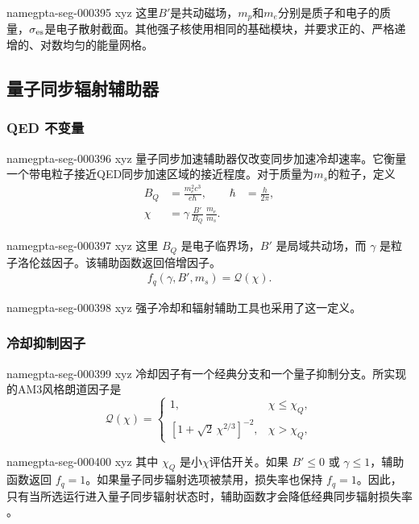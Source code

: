 \documentclass[twocolumn]{aastex702}
\makeatletter
\providecommand{\gptareaderanchor}[1]{\pdfdest name{#1} xyz}%
\providecommand{\gptareaderanchor}[1]{\special{pdf:dest (#1) [ @thispage /XYZ @xpos @ypos null ]}}%
\makeatother
\begin{document}
\gptareaderanchor{gpta-seg-000395}%
这里\(B'\)是共动磁场，\(m_p\)和\(m_e\)分别是质子和电子的质量，\(\sigma_{\rm es}\)是电子散射截面。其他强子核使用相同的基础模块，并要求正的、严格递增的、对数均匀的能量网格。

\subsection{量子同步辐射辅助器}

\subsubsection{QED 不变量}


\gptareaderanchor{gpta-seg-000396}%
量子同步加速辅助器仅改变同步加速冷却速率。它衡量一个带电粒子接近QED同步加速区域的接近程度。对于质量为\(m_s\)的粒子，定义
\begin{equation}
\begin{aligned}
B_Q&=\frac{m_e^2c^3}{e\hbar},&
\hbar&=\frac{h}{2\pi},\\
\chi&=\gamma\,\frac{B'}{B_Q}\,\frac{m_e}{m_s}.
\end{aligned}
\end{equation}

\gptareaderanchor{gpta-seg-000397}%
这里 \(B_Q\) 是电子临界场，\(B'\) 是局域共动场，而 \(\gamma\) 是粒子洛伦兹因子。该辅助函数返回倍增因子。
\begin{equation}
\begin{aligned}
f_q(\gamma,B',m_s)=\mathcal{Q}(\chi).
\end{aligned}
\end{equation}

\gptareaderanchor{gpta-seg-000398}%
强子冷却和辐射辅助工具也采用了这一定义。

\subsubsection{冷却抑制因子}


\gptareaderanchor{gpta-seg-000399}%
冷却因子有一个经典分支和一个量子抑制分支。所实现的AM3风格朗道因子是
\begin{equation}
\mathcal{Q}(\chi)=
\begin{cases}
1, & \chi\le\chi_Q,\\
\left[1+\sqrt{2}\,\chi^{2/3}\right]^{-2}, & \chi>\chi_Q,
\end{cases}
\end{equation}

\gptareaderanchor{gpta-seg-000400}%
其中 \(\chi_Q\) 是小\(\chi\)评估开关。如果 \(B'\le0\) 或 \(\gamma\le1\)，辅助函数返回 \(f_q=1\)。如果量子同步辐射选项被禁用，损失率也保持 \(f_q=1\)。因此，只有当所选运行进入量子同步辐射状态时，辅助函数才会降低经典同步辐射损失率 \citep{Klinger2024AM3}。
\end{document}
